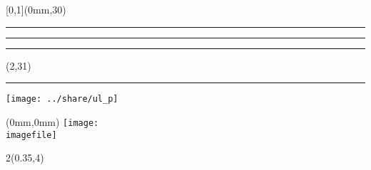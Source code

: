 
\begingroup
{}
\textblockorigin{0mm}{0mm}
\setlength{\parindent}{0mm}
\setlength{\imageheight}{29\TPVertModule}
\setlength{\banderougewidth}{2\TPHorizModule}
\setlength{\banderougeheight}{\TPVertModule}
\setlength{\bandeorwidth}{\TPHorizModule}
\setlength{\bandeorheight}{\banderougeheight}
\setlength{\logoheight}{2.5\TPVertModule}
\setlength{\gapwidth}{1.5pt}
\addtolength{\bandeorwidth}{-\gapwidth}
\addtolength{\imageheight}{-\gapwidth}
\setlength{\fboxrule}{3pt}
\setlength{\fboxsep}{0pt}

\def\titlefmt{%
  \sffamily\bfseries\fontsize{42}{42}\selectfont\thetitle}
\def\parttitlefmt{%
  \sffamily\mdseries\fontsize{30}{30}\selectfont\theparttitle}
\def\authorfmt{%
  \sffamily\bfseries\fontsize{25}{25}\selectfont\theauthor}
\def\affiliation{%
  \sffamily\mdseries\fontsize{22}{22}\selectfont
  Professeur titulaire \\
  École d'actuariat, Université Laval \\[12mm]
  Avec la collaboration de \\
  \bfseries\fontsize{25}{30}\selectfont
  Laurent Caron}
\def\edition{%
  \sffamily\mdseries\fontsize{22}{22}\selectfont
  Édition {\fullcaps\year}.\month}

\begin{textblock*}{\paperwidth}[0,1](0mm,30\TPVertModule)
  \textcolor{rouge}{\rule{\banderougewidth}{\banderougeheight}}%
  \rule{\gapwidth}{0pt}%
  \textcolor{or}{\rule{\bandeorwidth}{\bandeorheight}}           %
\end{textblock*}

\begin{textblock*}{\TPHorizModule}(2\TPHorizModule,31\TPVertModule)
  \rule{\gapwidth}{0pt}%
  \texttt{[image: ../share/ul\_p]}
\end{textblock*}

\begin{textblock*}{\paperwidth}(0mm,0mm)
  \texttt{[image: \\imagefile]}
\end{textblock*}

\begin{textblock*}{2\TPHorizModule}(0.35\TPHorizModule,4\TPVertModule)
  \textcolor{white}{\titlefmt}
\end{textblock*}

